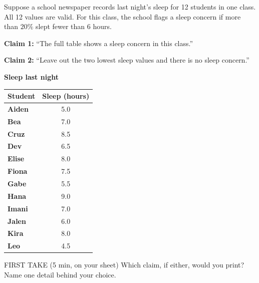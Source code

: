 \documentclass[14pt]{extarticle}
\begin{document}
\pagestyle{empty}


\noindent\begin{minipage}[t]{0.57\linewidth}
\vspace{0pt}
Suppose a school newspaper records last night's sleep for 12 students in one class. All 12 values are valid. For this class, the school flags a sleep concern if more than $20\%$ slept fewer than 6 hours.\par\smallskip \textbf{Claim 1:} ``The full table shows a sleep concern in this class.''\par \textbf{Claim 2:} ``Leave out the two lowest sleep values and there is no sleep concern.''\par
\end{minipage}\hfill
\begin{minipage}[t]{0.40\linewidth}
\vspace{0pt}
\begin{center}
\textbf{Sleep last night}\par\smallskip
\begin{tabular}{|l|c|}
\hline
\textbf{Student} & \textbf{Sleep (hours)} \\ \hline
\textbf{Aiden} & 5.0 \\ \hline
\textbf{Bea} & 7.0 \\ \hline
\textbf{Cruz} & 8.5 \\ \hline
\textbf{Dev} & 6.5 \\ \hline
\textbf{Elise} & 8.0 \\ \hline
\textbf{Fiona} & 7.5 \\ \hline
\textbf{Gabe} & 5.5 \\ \hline
\textbf{Hana} & 9.0 \\ \hline
\textbf{Imani} & 7.0 \\ \hline
\textbf{Jalen} & 6.0 \\ \hline
\textbf{Kira} & 8.0 \\ \hline
\textbf{Leo} & 4.5 \\ \hline
\end{tabular}
\end{center}
\end{minipage}

\begin{firsttakebox}{FIRST TAKE (5 min, on your sheet)}
Which claim, if either, would you print? Name one detail behind your choice.
\end{firsttakebox}
\end{document}
